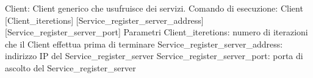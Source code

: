 Client\-: Client generico che usufruisce dei servizi. Comando di esecuzione\-: Client \mbox{[}Client\-\_\-iteretions\mbox{]} \mbox{[}Service\-\_\-register\-\_\-server\-\_\-address\mbox{]} \mbox{[}Service\-\_\-register\-\_\-server\-\_\-port\mbox{]} Parametri Client\-\_\-iteretions\-: numero di iterazioni che il Client effettua prima di terminare Service\-\_\-register\-\_\-server\-\_\-address\-: indirizzo I\-P del Service\-\_\-register\-\_\-server Service\-\_\-register\-\_\-server\-\_\-port\-: porta di ascolto del Service\-\_\-register\-\_\-server 